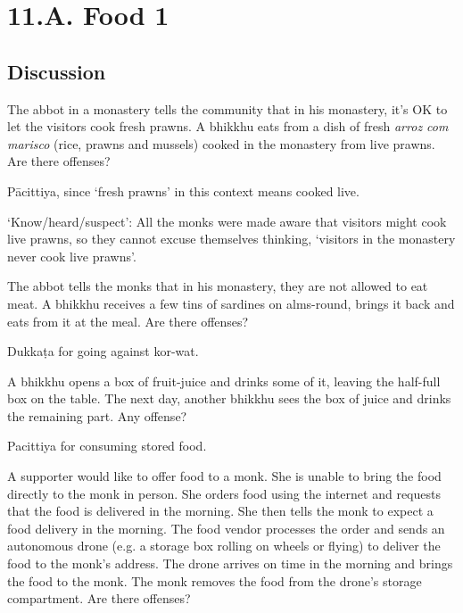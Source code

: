 \chapter{11.A. Food 1}
\renewcommand*{\theChapterTitle}{11.A. Food 1}

\section*{Discussion}

The abbot in a monastery tells the community that in his monastery, it's OK to let the visitors cook fresh prawns.
A bhikkhu eats from a dish of fresh \emph{arroz com marisco} (rice, prawns and mussels) cooked in the monastery from live prawns.
Are there offenses?

\begin{solution}
  Pācittiya, since `fresh prawns' in this context means cooked live.

  `Know/heard/suspect': All the monks were made aware that visitors might cook live prawns,
  so they cannot excuse themselves thinking, `visitors in the monastery never cook live prawns'.
\end{solution}

\bigskip
    
The abbot tells the monks that in his monastery, they are not allowed to eat meat.
A bhikkhu receives a few tins of sardines on alms-round, brings it back and eats from it at the meal.
Are there offenses?

\begin{solution}
  Dukkaṭa for going against kor-wat.
\end{solution}

\bigskip

A bhikkhu opens a box of fruit-juice and drinks some of it, leaving the
half-full box on the table. The next day, another bhikkhu sees the box of juice
and drinks the remaining part. Any offense?

\begin{solution}
  Pacittiya for consuming stored food.
\end{solution}

\bigskip

A supporter would like to offer food to a monk. She is unable to bring the food
directly to the monk in person. She orders food using the internet and requests
that the food is delivered in the morning. She then tells the monk to expect a
food delivery in the morning. The food vendor processes the order and sends an
autonomous drone (e.g. a storage box rolling on wheels or flying) to deliver the
food to the monk's address. The drone arrives on time in the morning and brings
the food to the monk. The monk removes the food from the drone's storage
compartment. Are there offenses?

